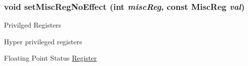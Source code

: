 \hypertarget{classSparcISA_1_1ISA_ae0c0c2b6f950ae0716dd72d9ecc38b18}{
\subsubsection[{setMiscRegNoEffect}]{\setlength{\rightskip}{0pt plus 5cm}void setMiscRegNoEffect (int {\em miscReg}, \/  const {\bf MiscReg} {\em val})}}
\label{classSparcISA_1_1ISA_ae0c0c2b6f950ae0716dd72d9ecc38b18}


Privilged Registers

Hyper privileged registers

Floating Point Status \hyperlink{classRegister}{Register} 


